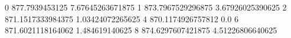 0 877.7939453125 7.67645263671875
1 873.7967529296875 3.67926025390625
2 871.1517333984375 1.03424072265625
4 870.1174926757812 0.0
6 871.6021118164062 1.484619140625
8 874.6297607421875 4.51226806640625
